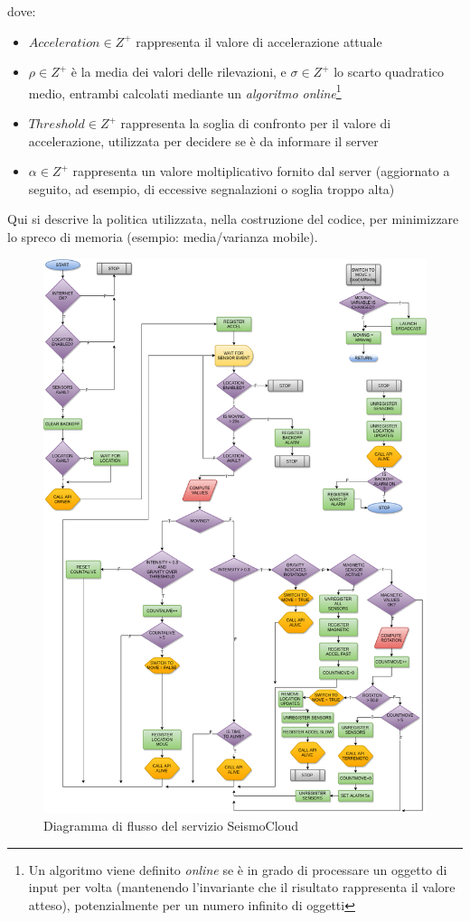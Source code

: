 \documentclass[a4paper,10pt]{memoir}
\begin{document}
dove: \begin{itemize}
\item $Acceleration \in Z^+$ rappresenta il valore di accelerazione attuale
\item $\rho \in Z^+$ è la media dei valori delle rilevazioni, e $\sigma \in Z^+$ lo scarto quadratico medio, entrambi calcolati mediante un \textit{algoritmo online}\footnote{Un algoritmo viene definito \textit{online} se è in grado di processare un oggetto di input per volta (mantenendo l'invariante che il risultato rappresenta il valore atteso), potenzialmente per un numero infinito di oggetti}
\item $Threshold \in Z^+$ rappresenta la soglia di confronto per il valore di accelerazione, utilizzata per decidere se è da informare il server
\item $\alpha \in Z^+$ rappresenta un valore moltiplicativo fornito dal server (aggiornato a seguito, ad esempio, di eccessive segnalazioni o soglia troppo alta)
\end{itemize}

Qui si descrive la politica utilizzata, nella costruzione del codice, per minimizzare lo spreco di memoria (esempio: media/varianza mobile).

\clearpage

\begin{figure}[ht]
\centering
\caption{Diagramma di flusso del servizio SeismoCloud}
\label{fig:serviceflowdiagram}
\includegraphics[width=\textwidth]{SeismoCloud_flowdiag}
\end{figure}
\end{document}
